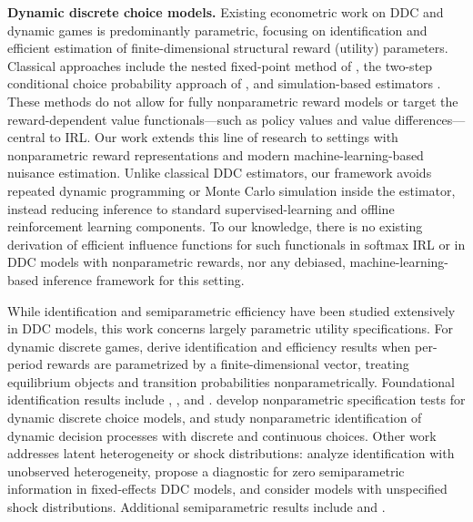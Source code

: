 \documentclass[11pt]{article}
\theoremstyle{plain}
\begin{document}
 

\noindent \textbf{Dynamic discrete choice models.} Existing econometric work on
DDC and dynamic games is predominantly parametric, focusing on identification
and efficient estimation of finite-dimensional structural reward (utility)
parameters. Classical approaches include the nested fixed-point method of
\citet{rust1987optimal}, the two-step conditional choice probability approach
of \citet{hotz1993conditional}, and simulation-based estimators
\citep{hotz1994simulation,aguirregabiria2010dynamic}. These methods do not
allow for fully nonparametric reward models or target the reward-dependent
value functionals—such as policy values and value differences—central to IRL.
Our work extends this line of research to settings with nonparametric reward
representations and modern machine-learning-based nuisance estimation. Unlike
classical DDC estimators, our framework avoids repeated dynamic programming or
Monte Carlo simulation inside the estimator, instead reducing inference to
standard supervised-learning and offline reinforcement learning components. To
our knowledge, there is no existing derivation of efficient influence functions
for such functionals in softmax IRL or in DDC models with nonparametric
rewards, nor any debiased, machine-learning-based inference framework for this
setting.

While identification and semiparametric efficiency have been studied extensively
in DDC models, this work concerns largely parametric utility specifications. For
dynamic discrete games, \citet{bajari2015dynamic} derive identification and
efficiency results when per-period rewards are parametrized by a
finite-dimensional vector, treating equilibrium objects and transition
probabilities nonparametrically. Foundational identification results include
\citet{hotz1993conditional}, \citet{hotz1994simulation}, and
\citet{magnac2002identifying}. \citet{blundell2007non} develop nonparametric
specification tests for dynamic discrete choice models, and
\citet{blevins2014nonparametric} study nonparametric identification of dynamic
decision processes with discrete and continuous choices. Other work addresses
latent heterogeneity or shock distributions: \citet{kasahara2009nonparametric}
analyze identification with unobserved heterogeneity,
\citet{buchinsky2010semiparametric} propose a diagnostic for zero semiparametric
information in fixed-effects DDC models, and \citet{buchholz2021semiparametric}
consider models with unspecified shock distributions. Additional semiparametric
results include \citet{arcidiacono2011conditional} and \citet{norets2014semiparametric}.
\end{document}
